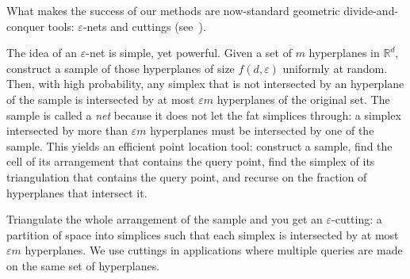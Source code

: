 What makes the success of our methods are now-standard geometric
divide-and-conquer tools: \(\varepsilon\)-nets and cuttings
(see~\cite[Sections~40.1and~40.4]{CMR04}).

The idea of an \(\varepsilon\)-net is simple, yet powerful. Given a set of
\(m\) hyperplanes in \(\mathbb{R}^d\), construct a sample of those hyperplanes
of size \(f(d, \varepsilon)\) uniformly at random. Then, with high probability,
any simplex that is not intersected by an hyperplane of the sample is intersected
by at most \(\varepsilon m\) hyperplanes of the original set. The sample is
called a \emph{net} because it does not let the fat simplices through: a
simplex intersected by more than \(\varepsilon m\) hyperplanes must be intersected
by one of the sample.
%
This yields an efficient point location tool: construct a sample, find the cell
of its arrangement that contains the query point, find the simplex of its
triangulation that contains the query point, and recurse on the fraction of
hyperplanes that intersect it.

Triangulate the whole arrangement of the sample and you get an
\(\varepsilon\)-cutting: a partition of space into simplices such
that each simplex is intersected by at most \(\varepsilon m\) hyperplanes.
We use cuttings in applications where multiple queries are made on the same set
of hyperplanes.
